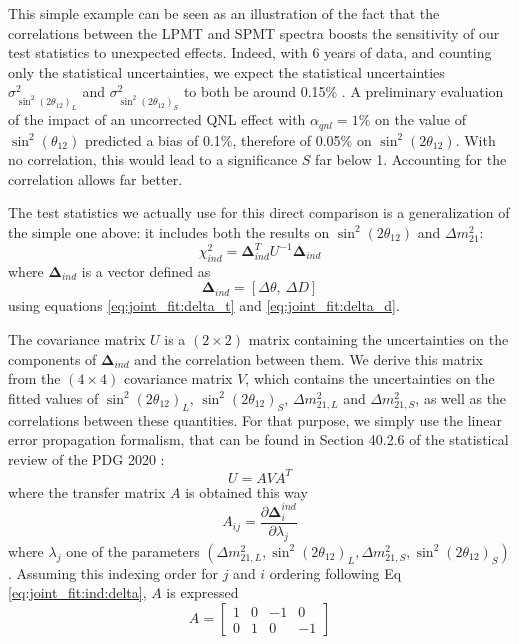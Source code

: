 \documentclass[../main.tex]{subfiles}
\begin{document}
This simple example can be seen as an illustration of the fact that the correlations between the LPMT and SPMT spectra boosts the sensitivity of our test statistics to unexpected effects. Indeed, with 6 years of data, and counting only the statistical uncertainties, we expect the statistical uncertainties $\sigma^2_{\sin^2(2\theta_{12})_L}$ and $\sigma^2_{\sin^2(2\theta_{12})_S}$ to both be around 0.15\% \cite{juno_collaboration_sub-percent_2022}. A preliminary evaluation \cite{cabrera_multi-calorimetry_2023} of the impact of an uncorrected QNL effect with $\alpha_{qnl} = 1\%$ on the value of $\sin^2(\theta_{12})$ predicted a bias of 0.1\%, therefore of 0.05\% on $\sin^2(2\theta_{12})$. With no correlation, this would lead to a significance $S$ far below 1. Accounting for the correlation allows far better.

The test statistics we actually use for this direct comparison is a generalization of the simple one above: it includes both the results on $\sin^2(2\theta_{12})$ and $\Delta m^2_{21}$:
\begin{equation}
  \chi^2_{ind} = \bm{\Delta}_{ind}^T U^{-1} \bm{\Delta}_{ind}
\end{equation}
where $\bm{\Delta}_{ind}$ is a vector defined as
\begin{equation}
  \label{eq:joint_fit:ind:delta}
  \bm{\Delta}_{ind} = [ \Delta \theta, ~ \Delta D ]
\end{equation}
using equations \ref{eq:joint_fit:delta_t} and \ref{eq:joint_fit:delta_d}.

The covariance matrix $U$ is a $(2 \times 2)$ matrix containing the uncertainties on the components of $\bm{\Delta}_{ind}$ and the correlation between them. We derive this matrix from the $(4 \times 4)$ covariance matrix $V$, which contains the uncertainties on the fitted values of $\sin^2(2\theta_{12})_L$, $\sin^2(2\theta_{12})_S$, $\Delta m^2_{21,L}$ and $\Delta m^2_{21,S}$, as well as the correlations between these quantities.
For that purpose, we simply use the linear error propagation formalism, that can be found in Section 40.2.6 of the statistical review of the PDG 2020 \cite{particle_data_group_review_2020}:
\begin{equation}
  U = A V A^T
\end{equation}
where the transfer matrix $A$ is obtained this way
\begin{equation}
  A_{ij} = \frac{\partial \bm{\Delta}^{ind}_i}{\partial \lambda_j}
\end{equation}
where $\lambda_j$ one of the parameters $(\Delta m^2_{21,L}, \sin^2(2\theta_{12})_L, \Delta m^2_{21,S}, \sin^2(2\theta_{12})_S)$. Assuming this indexing order for $j$ and $i$ ordering following Eq \ref{eq:joint_fit:ind:delta}, $A$ is expressed
\begin{equation}
  A = \begin{bmatrix}
    1 & 0 & -1 & 0\\
    0 & 1 & 0 & -1
    \end{bmatrix}
\end{equation}
\end{document}
